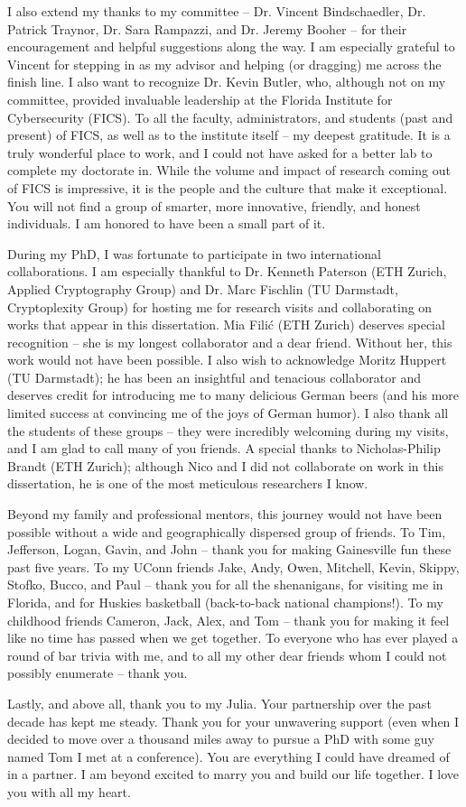 I also extend my thanks to my committee -- Dr. Vincent Bindschaedler, Dr. Patrick Traynor, Dr. Sara Rampazzi, and Dr. Jeremy Booher -- for their encouragement and helpful suggestions along the way. I am especially grateful to Vincent for stepping in as my advisor and helping (or dragging) me across the finish line. I also want to recognize Dr. Kevin Butler, who, although not on my committee, provided invaluable leadership at the Florida Institute for Cybersecurity (FICS). To all the faculty, administrators, and students (past and present) of FICS, as well as to the institute itself -- my deepest gratitude. It is a truly wonderful place to work, and I could not have asked for a better lab to complete my doctorate in. While the volume and impact of research coming out of FICS is impressive, it is the people and the culture that make it exceptional. You will not find a group of smarter, more innovative, friendly, and honest individuals. I am honored to have been a small part of it.

During my PhD, I was fortunate to participate in two international collaborations. I am especially thankful to Dr. Kenneth Paterson (ETH Zurich, Applied Cryptography Group) and Dr. Marc Fischlin (TU Darmstadt, Cryptoplexity Group) for hosting me for research visits and collaborating on works that appear in this dissertation. Mia Filić (ETH Zurich) deserves special recognition -- she is my longest collaborator and a dear friend. Without her, this work would not have been possible. I also wish to acknowledge Moritz Huppert (TU Darmstadt); he has been an insightful and tenacious collaborator and deserves credit for introducing me to many delicious German beers (and his more limited success at convincing me of the joys of German humor). I also thank all the students of these groups -- they were incredibly welcoming during my visits, and I am glad to call many of you friends. A special thanks to Nicholas-Philip Brandt (ETH Zurich); although Nico and I did not collaborate on work in this dissertation, he is one of the most meticulous researchers I know.

Beyond my family and professional mentors, this journey would not have been possible without a wide and geographically dispersed group of friends. To Tim, Jefferson, Logan, Gavin, and John -- thank you for making Gainesville fun these past five years. To my UConn friends Jake, Andy, Owen, Mitchell, Kevin, Skippy, Stofko, Bucco, and Paul -- thank you for all the shenanigans, for visiting me in Florida, and for Huskies basketball (back-to-back national champions!). To my childhood friends Cameron, Jack, Alex, and Tom -- thank you for making it feel like no time has passed when we get together. To everyone who has ever played a round of bar trivia with me, and to all my other dear friends whom I could not possibly enumerate -- thank you.

Lastly, and above all, thank you to my Julia. Your partnership over the past decade has kept me steady. Thank you for your unwavering support (even when I decided to move over a thousand miles away to pursue a PhD with some guy named Tom I met at a conference). You are everything I could have dreamed of in a partner. I am beyond excited to marry you and build our life together. I love you with all my heart.